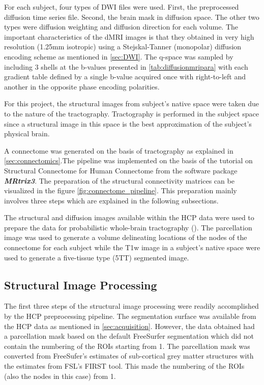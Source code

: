 \documentclass[msthesis.tex]{subfiles}
\begin{document}
For each subject, four types of DWI files were used. First, the preprocessed diffusion time series file. Second, the brain mask in diffusion space. The other two types were diffusion weighting and diffusion direction for each volume. The important characteristics of the dMRI images is that they obtained in very high resolution (1.25mm isotropic) using a Stejskal-Tanner (monopolar) diffusion encoding scheme as mentioned in \autoref{sec:DWI}. The q-space was sampled by including 3 shells at the b-values presented in \autoref{tab:diffusionmripara} with each gradient table defined by a single b-value acquired once with right-to-left and another in the opposite phase encoding polarities. 

For this project, the structural images from subject's native space were taken due to the nature of the tractography. Tractography is performed in the subject space since a structural image in this space is the best approximation of the subject's physical brain. 

A connectome was generated on the basis of tractography as explained in \autoref{sec:connectomics}.The pipeline was implemented on the basis of the tutorial on Structural Connectome for Human Connectome from the software package \textbf{\textit{MRtrix3}}. The preparation of the structural connectivity matrices can be visualized in the figure \autoref{fig:connectome_pipeline}. This preparation mainly involves three steps which are explained in the following subsections.

The structural and diffusion images available within the HCP data were used to prepare the data for probabilistic whole-brain tractography (\cite{parker2003framework}). The parcellation image was used to generate a volume delineating locations of the nodes of the connectome for each subject while the T1w image in a subject's native space were used to generate a five-tissue type (5TT) segmented image.

\subsection{Structural Image Processing}
\label{subsec:struct_diff}

The first three steps of the structural image processing were readily accomplished by the HCP preprocessing pipeline. The segmentation surface was available from the HCP data as mentioned in \autoref{sec:acquisition}. However, the data obtained had a parcellation mask based on the default FreeSurfer segmentation which did not contain the numbering of the ROIs starting from 1. The parcellation mask was converted from FreeSufer's estimates of sub-cortical grey matter structures with the estimates from FSL's FIRST tool. This made the numbering of the ROIs (also the nodes in this case) from 1. 
\end{document}
